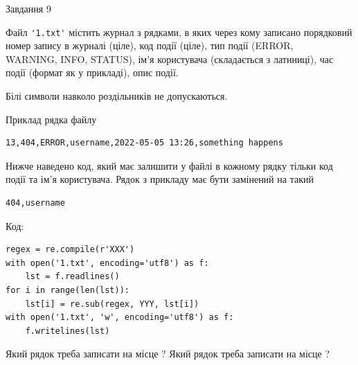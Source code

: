 \documentclass[12pt, ukrainian]{article}
\def\code#1{\Verb!#1!}
\begin{document}
{\begin{minipage}[t]{8.0cm}
\end{minipage}

               
{\begin{center}Завдання {9}\end{center}}
\vspace{-4mm}
Файл \code{'1.txt'} містить журнал з рядками, в яких через кому записано поряд\-ко\-вий номер запису в журналі (ціле), код події (ціле), тип події (ERROR, \\WARNING, INFO, STATUS), ім'я користувача (складається з латиниці), час події (фор\-мат як у прикладі), опис події.

Білі символи навколо роздільників не допускаються.

Приклад рядка файлу



\begin{verbatim}
13,404,ERROR,username,2022-05-05 13:26,something happens
\end{verbatim}


Нижче наведено код, який має залишити у файлі в кожному рядку тільки код події та ім'я користувача. Рядок з прикладу має бути замінений на такий



\begin{verbatim}
404,username
\end{verbatim}




Код:



\begin{verbatim}
regex = re.compile(r'XXX')
with open('1.txt', encoding='utf8') as f:
    lst = f.readlines()
for i in range(len(lst)):
    lst[i] = re.sub(regex, YYY, lst[i])
with open('1.txt', 'w', encoding='utf8') as f:
    f.writelines(lst)
\end{verbatim}





Який рядок треба записати на місце  ?
Який рядок треба записати на місце  ?\par

}
\end{document}
